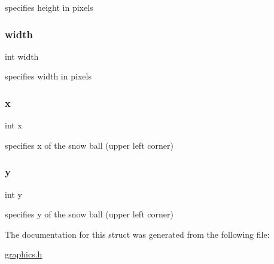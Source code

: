 specifies height in pixels 

\mbox{\label{struct_snow_a2474a5474cbff19523a51eb1de01cda4}} 
\subsubsection{\texorpdfstring{width}{width}}
{\footnotesize\ttfamily int width}



specifies width in pixels 

\mbox{\label{struct_snow_a6150e0515f7202e2fb518f7206ed97dc}} 
\subsubsection{\texorpdfstring{x}{x}}
{\footnotesize\ttfamily int x}



specifies x of the snow ball (upper left corner) 

\mbox{\label{struct_snow_a0a2f84ed7838f07779ae24c5a9086d33}} 
\subsubsection{\texorpdfstring{y}{y}}
{\footnotesize\ttfamily int y}



specifies y of the snow ball (upper left corner) 



The documentation for this struct was generated from the following file\+:\begin{DoxyCompactItemize}
\item 
\hyperlink{graphics_8h}{graphics.\+h}\end{DoxyCompactItemize}
